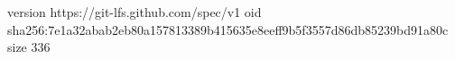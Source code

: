 version https://git-lfs.github.com/spec/v1
oid sha256:7e1a32abab2eb80a157813389b415635e8eeff9b5f3557d86db85239bd91a80c
size 336
